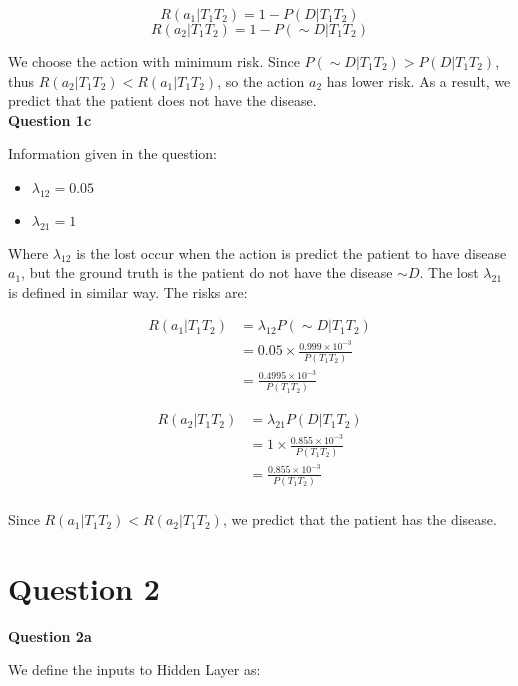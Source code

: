 \documentclass[11pt,a4paper]{report}
\begin{document}
\begin{multicols*}{2}
$$R(a_1|T_1 T_2) = 1 - P( D | T_1 T_2)$$
$$R(a_2|T_1 T_2) = 1 - P( \sim D | T_1 T_2)$$

\noindent We choose the action with minimum risk. Since $P(\sim D|T_1 T_2) > P(D|T_1 T_2)$, thus $R(a_2|T_1 T_2) < R(a_1|T_1 T_2)$, so the action $a_2$ has lower risk. As a result, we predict that the patient does not have the disease.\\

\noindent \textbf{Question 1c}

\noindent Information given in the question:
\begin{itemize}
  \item $\lambda_{12} = 0.05$
  \item $\lambda_{21} = 1$
\end{itemize}

\noindent Where $\lambda_{12}$ is the lost occur when the action is predict the patient to have disease $a_1$, but the ground truth is the patient do not have the disease $\sim D$. The lost $\lambda_{21}$ is defined in similar way. The risks are:

\begin{equation*}
\begin{split}
R(a_1|T_1 T_2) &= \lambda_{12} P(\sim D | T_1 T_2)\\
&= 0.05 \times \frac{0.999 \times 10^{-3}}{P(T_1 T_2)}\\
&= \frac{0.4995 \times 10^{-3}}{P(T_1 T_2)}
\end{split}
\end{equation*}

\begin{equation*}
\begin{split}
R(a_2|T_1 T_2) &= \lambda_{21} P( D | T_1 T_2)\\
&= 1 \times \frac{0.855 \times 10^{-3}}{P(T_1 T_2)}\\
&= \frac{0.855 \times 10^{-3}}{P(T_1 T_2)}\\
\end{split}
\end{equation*}

\noindent Since $R(a_1|T_1 T_2) < R(a_2|T_1 T_2)$, we predict that the patient has the disease.

\section{Question 2}
\noindent \textbf{Question 2a}

\noindent We define the inputs to Hidden Layer as:


\end{multicols*}
\end{document}
